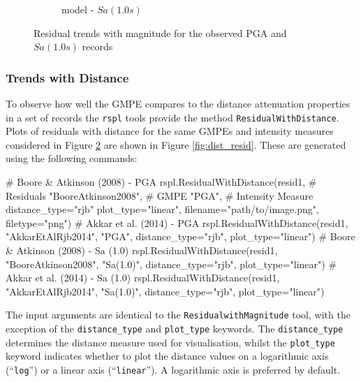 \begin{figure}[htb]
\begin{subfigure}[b]{0.49\textwidth}
     \caption{\cite{Akkar_etal2014} model - $Sa \left( {1.0 s} \right)$}
      \label{fig:sa1_mag_akkar2014}
  \end{subfigure}
  \caption{Residual trends with magnitude for the observed PGA and $Sa \left( {1.0 s} \right)$ records}
  \label{fig:mag_resid}
\end{figure}


\subsubsection{Trends with Distance}

To observe how well the GMPE compares to the distance attenuation properties in a set of records the \verb=rspl= tools provide the method \verb=ResidualWithDistance=. Plots of residuals with distance for the same GMPEs and intensity measures considered in Figure \ref{fig:mag_resid} are shown in Figure \ref{fig:dist_resid}. These are generated using the following commands:

\begin{python}[frame=single]
# Boore & Atkinson (2008)  - PGA
rspl.ResidualWithDistance(resid1,  # Residuals
                           "BooreAtkinson2008",  # GMPE
                           "PGA",   # Intensity Measure
                           distance_type="rjb"
                           plot_type="linear",
                           filename="path/to/image.png",
                           filetype="png")
# Akkar et al. (2014)  - PGA
rspl.ResidualWithDistance(resid1, "AkkarEtAlRjb2014",
                          "PGA", distance_type="rjb",
                          plot_type="linear") 
# Boore & Atkinson (2008)  - Sa (1.0)
rspl.ResidualWithDistance(resid1, "BooreAtkinson2008",
                          "Sa(1.0)", distance_type="rjb",
                          plot_type="linear") 
# Akkar et al. (2014)  - Sa (1.0)
rspl.ResidualWithDistance(resid1, "AkkarEtAlRjb2014",
                          "Sa(1.0)", distance_type="rjb",
                          plot_type="linear")                         
\end{python}

The input arguments are identical to the \verb=ResidualwithMagnitude= tool, with the exception of the \verb=distance_type= and \verb=plot_type= keywords. The \verb=distance_type= determines the distance measure used for visualisation, whilst the \verb=plot_type= keyword indicates whether to plot the distance values on a logarithmic axis (``\verb=log='') or a linear axis (``\verb=linear=''). A logarithmic axis is preferred by default.

